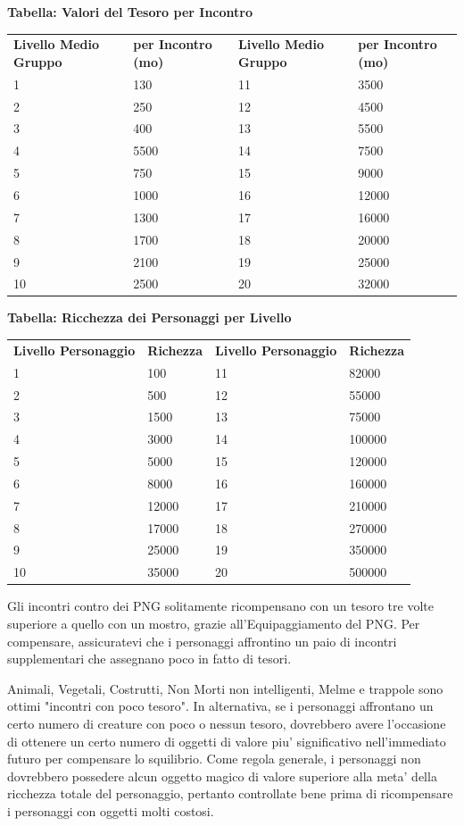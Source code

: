 \documentclass[a4paper,11pt,twoside,openany]{book}
\begin{document}
{\bigskip

\textbf{Tabella: Valori del Tesoro per Incontro}

\begin{tabular}{llll}
\toprule
\textbf{Livello Medio Gruppo} & \textbf{per Incontro (mo)} & \textbf{Livello Medio Gruppo} & \textbf{per Incontro (mo)}\tabularnewline
1 & 130 & 11 & 3500\tabularnewline
2 & 250 & 12 & 4500\tabularnewline
3 & 400 & 13 & 5500\tabularnewline
4 & 5500 & 14 & 7500\tabularnewline
5 & 750 & 15 & 9000\tabularnewline
6 & 1000 & 16 & 12000\tabularnewline
7 & 1300 & 17 & 16000\tabularnewline
8 & 1700 & 18 & 20000\tabularnewline
9 & 2100 & 19 & 25000\tabularnewline
10 & 2500 & 20 & 32000\tabularnewline
\end{tabular}
\bigskip

\textbf{Tabella: Ricchezza dei Personaggi per Livello}

\bigskip

\begin{tabular}{llll}
\toprule
\textbf{Livello Personaggio} & \textbf{Richezza} &\textbf{ Livello Personaggio} & \textbf{Richezza}\tabularnewline
1 & 100 & 11 & 82000\tabularnewline
2 & 500 & 12 & 55000\tabularnewline
3 & 1500 & 13 & 75000\tabularnewline
4 & 3000 & 14 & 100000\tabularnewline
5 & 5000 & 15 & 120000\tabularnewline
6 & 8000 & 16 & 160000\tabularnewline
7 & 12000 & 17 & 210000\tabularnewline
8 & 17000 & 18 & 270000\tabularnewline
9 & 25000 & 19 & 350000\tabularnewline
10 & 35000 & 20 & 500000\tabularnewline
\end{tabular}

\bigskip

Gli incontri contro dei PNG solitamente ricompensano con un tesoro
tre volte superiore a quello con un mostro, grazie all'Equipaggiamento
del PNG. Per compensare, assicuratevi che i personaggi affrontino
un paio di incontri supplementari che assegnano poco in fatto di tesori.

Animali, Vegetali, Costrutti, Non Morti non intelligenti, Melme e trappole sono ottimi "incontri con poco tesoro". In alternativa, se i personaggi affrontano un certo numero di creature con poco o nessun tesoro, dovrebbero avere l'occasione di ottenere un certo numero di oggetti di valore piu' significativo nell'immediato futuro per compensare lo squilibrio. Come regola generale, i personaggi non dovrebbero possedere alcun oggetto magico di valore superiore alla meta' della ricchezza totale del personaggio, pertanto controllate bene prima di ricompensare i personaggi con oggetti molti costosi.

}
\end{document}
